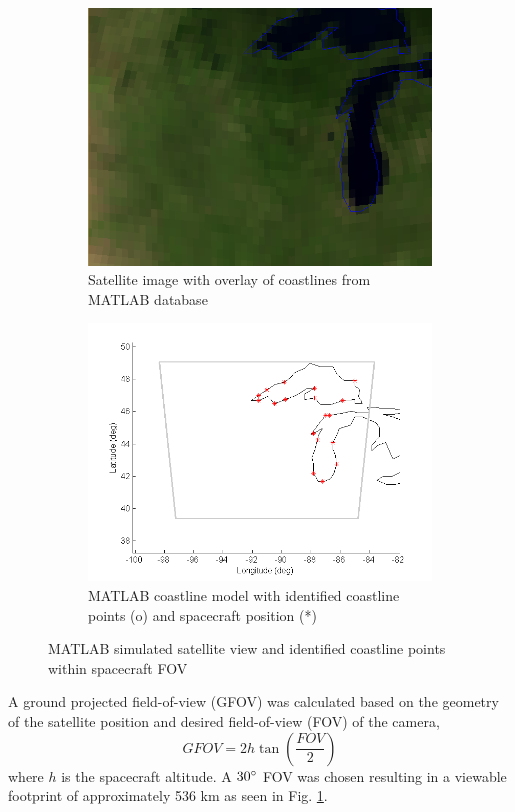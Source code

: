 \documentclass[]{aiaa-tc}%
\begin{document}
\begin{figure}[t!]
\centering
\begin{subfigure}{.49\textwidth}
  \centering
  \includegraphics[width=0.9\linewidth]{Michigan_sat}
  \caption{Satellite image with overlay of coastlines from MATLAB database}
  \label{fig:satellite}
\end{subfigure}%
\begin{subfigure}{.49\textwidth} 
  \centering
  \includegraphics[width=0.9\linewidth]{Michigan}
  \caption{MATLAB coastline model with identified coastline points (o) and spacecraft position (*)}
  \label{fig:coastline}
\end{subfigure}
\caption{MATLAB simulated satellite view and identified coastline points within spacecraft FOV}
\label{fig:matlabstuff}
\end{figure}
%

A ground projected field-of-view (GFOV) was calculated based on the geometry of the satellite position and desired field-of-view (FOV) of the camera,
%
\begin{equation}
GFOV=2h\tan\left(\frac{FOV}{2}\right)
\label{eq:GFOV}
\end{equation}
%
where $h$ is the spacecraft altitude.  A $30\degree$ FOV was chosen resulting in a viewable footprint of approximately 536 km as seen in Fig. \ref{fig:satellite}.
%
%
\end{document}
